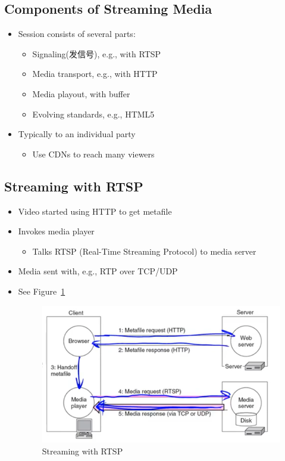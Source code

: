 \documentclass[12pt]{ctexart}   %
\begin{document}
	\subsection{Components of Streaming Media}
	\begin{itemize}
		\item Session consists of several parts:
		\begin{itemize}
			\item Signaling(发信号), e.g., with RTSP
			\item Media transport, e.g., with HTTP
			\item Media playout, with buffer
			\item Evolving standards, e.g., HTML5
		\end{itemize}
		
		\item Typically to an individual party
		\begin{itemize}
			\item Use CDNs to reach many viewers
		\end{itemize}
	\end{itemize}
	
	\subsection{Streaming with RTSP}
	\begin{itemize}
		\item Video started using HTTP to get metafile
		
		\item Invokes media player
		\begin{itemize}
			\item Talks RTSP (Real-Time Streaming Protocol) to media server
		\end{itemize}
		
		\item Media sent with, e.g., RTP over TCP/UDP
		\item See Figure~\ref{fig:9-3-5}
		  
		 \begin{figure}[h!] %
		\centering
		 \includegraphics[scale=0.7]{images/9-3-5}
		\caption{ Streaming with RTSP }
		 \label{fig:9-3-5}
		 \end{figure}
	\end{itemize}
	
\end{document}
